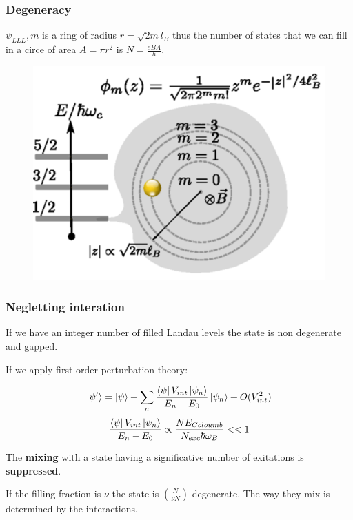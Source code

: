 \documentclass{beamer}
\begin{document}
\begin{frame}
\frametitle{Degeneracy}
\begin{center}

$\psi_{LLL}, m$ is a ring of radius $r = \sqrt{2 m} l_B$ thus the number of states that we can fill in a circe of area $A = \pi r^2$ is $N = \frac{e B A}{h}$.

\begin{figure}[!htb]
\centering
\includegraphics[scale=.4]{landauLevels.png}
\end{figure}

\end{center}
\end{frame}

\begin{frame}
\frametitle{Negletting interation}
\begin{center}

If we have an integer number of filled Landau levels the state is non degenerate and gapped.

If we apply first order perturbation theory:

\[
\ket{\psi'} = \ket{\psi} + \sum_n \frac{\bra{\psi} V_{int} \ket{\psi_n}}{E_n - E_0} \ket{\psi_n} + O(V_{int}^2)
\]
\[
\frac{\bra{\psi} V_{int} \ket{\psi_n}}{E_n - E_0} \propto \frac{N E_{Coloumb}}{N_{exc} \hbar \omega_B} << 1
\]

The \textbf{mixing} with a state having a significative number of exitations is \textbf{suppressed}. 


If the filling fraction is $\nu$ the state is ${N} \choose {\nu N}$-degenerate. The way they mix is determined by the interactions.

\end{center}
\end{frame}
\end{document}
